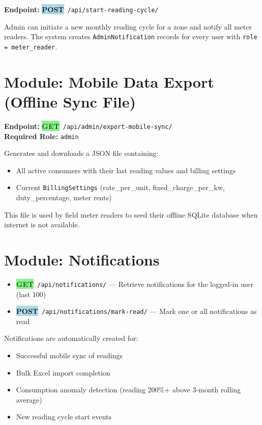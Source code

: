 \documentclass[12pt, a4paper]{report}
\newcommand{\httpget}{\colorbox{lightGreen}{\textcolor{darkGreen}{\textbf{\small GET}}}}
\newcommand{\httppost}{\colorbox{lightBlue}{\textcolor{deepBlue}{\textbf{\small POST}}}}
\newenvironment{featurelist}{%
    \begin{itemize}[leftmargin=1.5em, itemsep=2pt, parsep=0pt]
}{%
    \end{itemize}
}
\begin{document}
\textbf{Endpoint:} \httppost\ \texttt{/api/start-reading-cycle/}

Admin can initiate a new monthly reading cycle for a zone and notify all meter readers. The system creates \texttt{AdminNotification} records for every user with \texttt{role = meter\_reader}.

\section{Module: Mobile Data Export (Offline Sync File)}

\textbf{Endpoint:} \httpget\ \texttt{/api/admin/export-mobile-sync/}\\
\textbf{Required Role:} \texttt{admin}

Generates and downloads a JSON file containing:
\begin{featurelist}
    \item All active consumers with their last reading values and billing settings
    \item Current \texttt{BillingSettings} (rate\_per\_unit, fixed\_charge\_per\_kw, duty\_percentage, meter rents)
\end{featurelist}

This file is used by field meter readers to seed their offline SQLite database when internet is not available.

\section{Module: Notifications}

\begin{featurelist}
    \item \httpget\ \texttt{/api/notifications/} — Retrieve notifications for the logged-in user (last 100)
    \item \httppost\ \texttt{/api/notifications/mark-read/} — Mark one or all notifications as read
\end{featurelist}

Notifications are automatically created for:
\begin{featurelist}
    \item Successful mobile sync of readings
    \item Bulk Excel import completion
    \item Consumption anomaly detection (reading 200\%+ above 3-month rolling average)
    \item New reading cycle start events
\end{featurelist}
\end{document}
